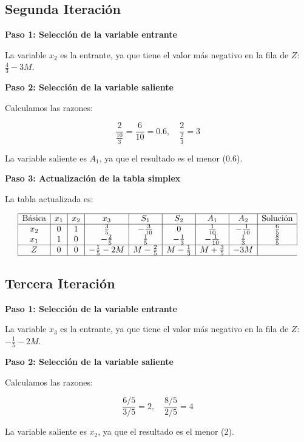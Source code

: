 \documentclass{article}
\begin{document}
\subsection*{Segunda Iteración}

\textbf{Paso 1: Selección de la variable entrante}

La variable \(x_2\) es la entrante, ya que tiene el valor más negativo en la fila de \(Z\): \(\frac{4}{3} - 3M\).

\textbf{Paso 2: Selección de la variable saliente}

Calculamos las razones:

\[
\frac{2}{\frac{10}{3}} = \frac{6}{10} = 0.6, \quad \frac{2}{\frac{2}{3}} = 3
\]

La variable saliente es \(A_1\), ya que el resultado es el menor (\(0.6\)).

\textbf{Paso 3: Actualización de la tabla simplex}

La tabla actualizada es:

\[
\begin{array}{|c|c|c|c|c|c|c|c|c|}
\hline
\text{Básica} & x_1 & x_2 & x_3 & S_1 & S_2 & A_1 & A_2 & \text{Solución} \\
\hline
x_2 & 0 & 1 & \frac{3}{5} & -\frac{3}{10} & 0 & \frac{1}{10} & -\frac{1}{10} & \frac{6}{5} \\
x_1 & 1 & 0 & -\frac{2}{5} & \frac{1}{5} & -\frac{1}{3} & -\frac{1}{10} & \frac{1}{3} & \frac{8}{5} \\
\hline
Z & 0 & 0 & -\frac{1}{5} - 2M & M - \frac{2}{5} & M - \frac{1}{3} & M + \frac{3}{5} & -3M \\
\hline
\end{array}
\]

\subsection*{Tercera Iteración}

\textbf{Paso 1: Selección de la variable entrante}

La variable \(x_3\) es la entrante, ya que tiene el valor más negativo en la fila de \(Z\): \(-\frac{1}{5} - 2M\).

\textbf{Paso 2: Selección de la variable saliente}

Calculamos las razones:

\[
\frac{6/5}{3/5} = 2, \quad \frac{8/5}{2/5} = 4
\]

La variable saliente es \(x_2\), ya que el resultado es el menor (\(2\)).
\end{document}
